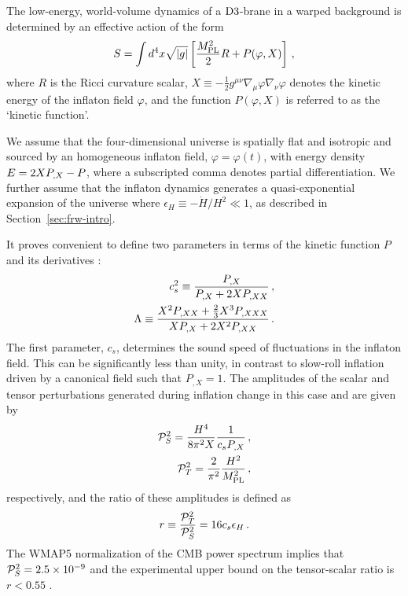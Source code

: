The low-energy, world-volume dynamics of a 
${\rm D3}$-brane in a warped background is determined 
by an effective action of the form 
% 
\begin{equation}
\label{eq:DBIaction-dbiintro2}
S=\int  d^4x \sqrt{|g|} \left[ \frac{M_{\mathrm{PL}}^2}{2} R 
+ P (\varphi , X) \right] \,,
\end{equation}
% 
where $R$ is the Ricci curvature scalar, 
$X \equiv -\frac{1}{2}g^{\mu \nu}\nabla_\mu \varphi \nabla_\nu \varphi$
denotes the kinetic energy of the inflaton field $\varphi$, and the function  
$P (\varphi , X)$ is referred to as the `kinetic function'.  


We assume that the four-dimensional universe is   
spatially flat and isotropic and sourced by an  
homogeneous inflaton field, $\varphi =\varphi (t)$, with energy 
density $E = 2XP_{,X} - P$, where a subscripted comma denotes partial
differentiation. 
We further assume that the inflaton dynamics  
generates a quasi-exponential expansion of the universe 
where $\epsilon_H \equiv -\dot{H}/H^2 \ll1$,
as described in Section~\ref{sec:frw-intro}. 


It proves convenient to define two parameters in terms of the 
kinetic  function $P$ and its derivatives \cite{lidser1,lidser3}: 
% 
\begin{eqnarray}
\label{eq:defcs-dbiintro}
 c_s^2 \equiv \frac{P_{,X}}{P_{,X} + 2X P_{,XX}} \,,
\\
\label{eq:deflambda-dbiintro}
\Lambda \equiv  \frac{X^2 P_{,XX} +
\frac{2}{3}X^3 P_{,XXX}}{X P_{,X} +
2X^2 P_{,XX}}\,.
\end{eqnarray}
% 
The first parameter, $c_s$, determines the sound speed of fluctuations 
in the inflaton field. This can be significantly less than unity, 
in contrast to slow-roll inflation driven by a canonical 
field such that $P_{,X} =1$.
The amplitudes of the scalar and tensor perturbations 
generated during inflation change in this case and are given by \cite{gm}
% 
\begin{eqnarray} 
\label{eq:Ps-dbiintro}
 \mathcal{P}_S^2 = \frac{H^4}{8\pi^2 X}\frac{1}{c_s P_{,X}} \,,
\\
\label{eq:Pt-dbiintro}
\mathcal{P}_T^2 = \frac{2}{\pi^2} \frac{H^2}{M_{\mathrm{PL}}^2} \,,
\end{eqnarray}
% 
respectively, and the ratio of these amplitudes 
is defined as \cite{gm} 
% 
\begin{equation}
\label{eq:rdefn-dbiintro}
r\equiv \frac{\mathcal{P}_T^2}{\mathcal{P}_S^2} = 16c_s \epsilon_H \,.
\end{equation}
%   
The WMAP5 normalization of the CMB power spectrum 
implies that $\mathcal{P}_S^2= 2.5\times10^{-9}$ and 
the experimental upper bound on the tensor-scalar 
ratio is $r <0.55$ \cite{Komatsu:2008hk}.

